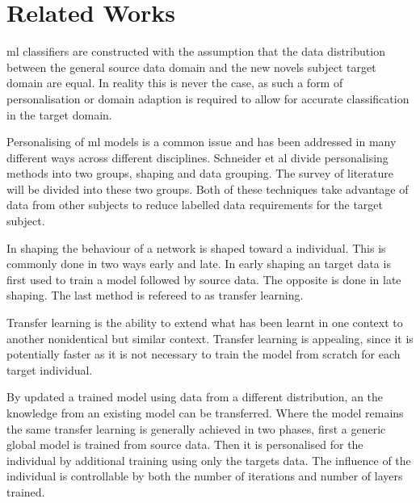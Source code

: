 \section{Related Works}
\label{sec:personalisation-related-works}

\acrshort{ml} classifiers are constructed with the assumption that the data distribution between the general source data domain and the new novels subject target domain are equal\cite{Farahani2020}. In reality this is never the case, as such a form of personalisation or domain adaption is required to allow for accurate classification in the target domain.

Personalising of \acrshort{ml} models is a common issue and has been addressed in many different ways across different disciplines\cite{Mairittha2021, Tomanek2021}. Schneider et al divide personalising methods into two groups, shaping and data grouping\cite{Schneider2021}. The survey of literature will be divided into these two groups. Both of these techniques take advantage of data from other subjects to reduce labelled data requirements for the target subject\cite{Shor2020}.

In shaping the behaviour of a network is shaped toward a individual. This is commonly done in two ways early and late. In early shaping an target data is first used to train a model followed by source data. The opposite is done in late shaping. The last method is refereed to as transfer learning.\cite{Schneider2021}

Transfer learning is the ability to extend what has been learnt in one context to another nonidentical but similar context\cite{Fallahzadeh2017}. Transfer learning is appealing, since it is potentially faster as it is not necessary to train the model from scratch for each target individual.

By updated a trained model using data from a different distribution, an the knowledge from an existing model can be transferred. Where the model remains the same transfer learning is generally achieved in two phases, first a generic global model is trained from source data. Then it is personalised for the individual by additional training using only the targets data. The influence of the individual is controllable by both the number of iterations and number of layers trained.\cite{Schneider2021, Mireshghallah2021}


